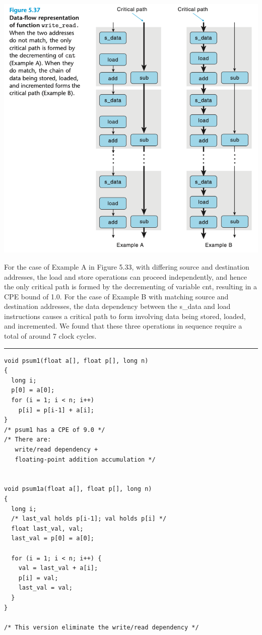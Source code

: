 \documentclass[11pt]{article}
\begin{document}
\begin{center}
\includegraphics[width=.9\linewidth]{pics/figure5.37-data-flow-representation-of-function-read-write.png}
\end{center}

For the case of Example A in Figure 5.33, with differing source and destination addresses, the load and store operations can proceed independently, and hence the only critical path is formed by the decrementing of variable cnt, resulting in a CPE bound of 1.0. For the case of Example B with matching source and destination addresses, the data dependency between the s\_data and load instructions causes a critical path to form involving data being stored, loaded, and incremented. We found that these three operations in sequence require a total of around 7 clock cycles.\\

\noindent\rule{\textwidth}{0.5pt}

\begin{verbatim}
void psum1(float a[], float p[], long n)
{
  long i;
  p[0] = a[0];
  for (i = 1; i < n; i++)
    p[i] = p[i-1] + a[i];
}
/* psum1 has a CPE of 9.0 */
/* There are:
   write/read dependency +
   floating-point addition accumulation */


void psum1a(float a[], float p[], long n)
{
  long i;
  /* last_val holds p[i-1]; val holds p[i] */
  float last_val, val;
  last_val = p[0] = a[0];

  for (i = 1; i < n; i++) {
    val = last_val + a[i];
    p[i] = val;
    last_val = val;
  }
}

/* This version eliminate the write/read dependency */

\end{verbatim}
\end{document}

